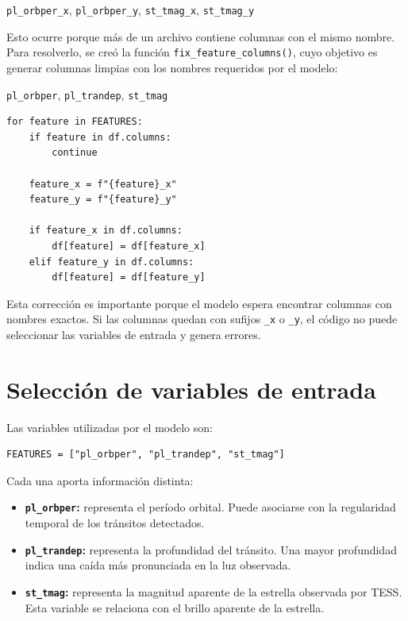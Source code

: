 \documentclass[12pt,letterpaper]{article}
\begin{document}
\begin{center}
\texttt{pl\_orbper\_x}, \texttt{pl\_orbper\_y}, \texttt{st\_tmag\_x}, \texttt{st\_tmag\_y}
\end{center}

Esto ocurre porque más de un archivo contiene columnas con el mismo nombre. Para resolverlo, se creó la función \texttt{fix\_feature\_columns()}, cuyo objetivo es generar columnas limpias con los nombres requeridos por el modelo:

\begin{center}
\texttt{pl\_orbper}, \texttt{pl\_trandep}, \texttt{st\_tmag}
\end{center}

\begin{lstlisting}[style=pythonstyle, caption={Corrección de columnas duplicadas}]
for feature in FEATURES:
    if feature in df.columns:
        continue

    feature_x = f"{feature}_x"
    feature_y = f"{feature}_y"

    if feature_x in df.columns:
        df[feature] = df[feature_x]
    elif feature_y in df.columns:
        df[feature] = df[feature_y]
\end{lstlisting}

Esta corrección es importante porque el modelo espera encontrar columnas con nombres exactos. Si las columnas quedan con sufijos \texttt{\_x} o \texttt{\_y}, el código no puede seleccionar las variables de entrada y genera errores.

\section{Selección de variables de entrada}

Las variables utilizadas por el modelo son:

\begin{lstlisting}[style=pythonstyle, caption={Variables de entrada del modelo}]
FEATURES = ["pl_orbper", "pl_trandep", "st_tmag"]
\end{lstlisting}

Cada una aporta información distinta:

\begin{itemize}
    \item \textbf{\texttt{pl\_orbper}:} representa el período orbital. Puede asociarse con la regularidad temporal de los tránsitos detectados.
    \item \textbf{\texttt{pl\_trandep}:} representa la profundidad del tránsito. Una mayor profundidad indica una caída más pronunciada en la luz observada.
    \item \textbf{\texttt{st\_tmag}:} representa la magnitud aparente de la estrella observada por TESS. Esta variable se relaciona con el brillo aparente de la estrella.
\end{itemize}
\end{document}
